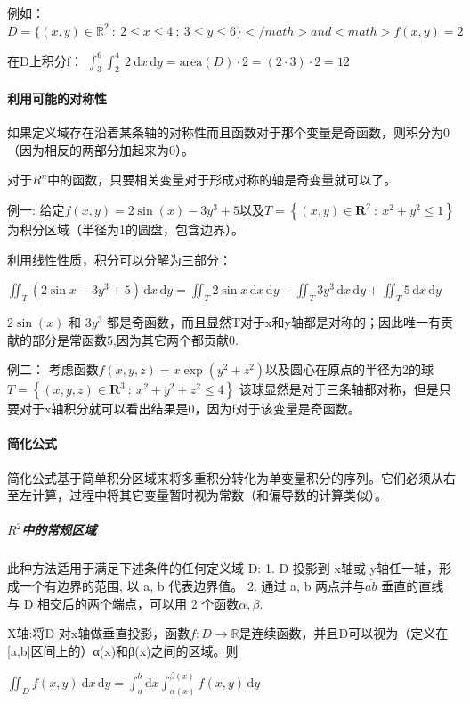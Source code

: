 \documentclass[UTF-8]{ctexart}
\begin{document}
例如：
$D = \{ (x,y) \in \mathbb{R}^2 \ : \ 2 \le x \le 4 \ ; \ 3 \le y \le 6 \}</math> and <math>f(x,y) = 2$

在D上积分f：
$\int_3^6 \int_2^4 \ 2 \ \mathrm{d}x\, \mathrm{d}y = \mbox{area}(D) \cdot 2 = (2 \cdot 3) \cdot 2 = 12$
\paragraph{利用可能的对称性}
如果定义域存在沿着某条轴的对称性而且函数对于那个变量是奇函数，则积分为0（因为相反的两部分加起来为0）。

对于$R^n$中的函数，只要相关变量对于形成对称的轴是奇变量就可以了。

例一:
给定$f(x,y) = 2 \sin(x)-3y^3+5$以及$T=\left \{ ( x,y) \in \mathbf{R}^2 \ : \ x^2+y^2\le 1 \right \}$为积分区域（半径为1的圆盘，包含边界）。

利用线性性质，积分可以分解为三部分：

$\iint_T (2\sin x - 3y^3 + 5) \, \mathrm{d}x \, \mathrm{d}y = \iint_T 2 \sin x \, \mathrm{d}x \, \mathrm{d}y - \iint_T 3y^3 \, \mathrm{d}x \, \mathrm{d}y + \iint_T 5 \, \mathrm{d}x \, \mathrm{d}y$

$2\sin(x)$ 和 $3y^3$ 都是奇函数，而且显然T对于x和y轴都是对称的；因此唯一有贡献的部分是常函数5,因为其它两个都贡献0.

例二：
考虑函数$f(x,y,z)=x \exp(y^2+z^2)$以及圆心在原点的半径为2的球
$T = \left \{ ( x,y, z) \in \mathbf{R}^3 \ : \ x^2+y^2+z^2 \le 4 \right \}$
该球显然是对于三条轴都对称，但是只要对于x轴积分就可以看出结果是0，因为f对于该变量是奇函数。

\paragraph{简化公式}
简化公式基于简单积分区域来将多重积分转化为单变量积分的序列。它们必须从右至左计算，过程中将其它变量暂时视为常数（和偏导数的计算类似）。

\subparagraph{$R^2$中的常规区域}
此种方法适用于满足下述条件的任何定义域 D:
1. D 投影到 x轴或 y轴任一轴，形成一个有边界的范围, 以 a, b 代表边界值。
2. 通过 a, b 两点并与$\overline {ab}$ 垂直的直线与 D 相交后的两个端点，可以用 2 个函数$\alpha , \beta $.

X轴:将D 对x轴做垂直投影，函數$f: D \longrightarrow \mathbb{R}$是连续函数，并且D可以视为（定义在[a,b]区间上的）α(x)和β(x)之间的区域。则

$\iint_D f(x,y)\ \mathrm{d}x\, \mathrm{d}y = \int_a^b \mathrm{d}x \int_{ \alpha (x)}^{ \beta (x)} f(x,y)\, \mathrm{d}y$
\end{document}
